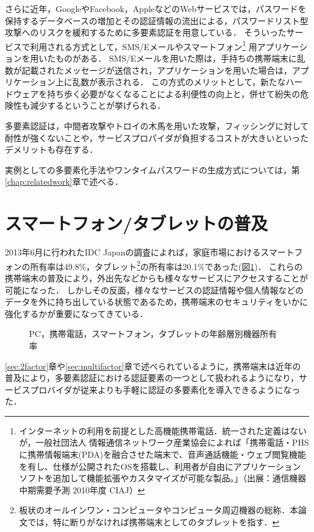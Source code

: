 さらに近年，GoogleやFacebook，AppleなどのWebサービスでは，パスワードを保持するデータベースの増加とその認証情報の流出による，パスワードリスト型攻撃へのリスク\cite{ipa07Outline}を緩和する\cite{lifehacker2F}ために多要素認証を用意している．
そういったサービスで利用される方式として，SMS/Eメールやスマートフォン\footnote{インターネットの利用を前提とした高機能携帯電話．統一された定義はないが，一般社団法人 情報通信ネットワーク産業協会によれば「携帯電話・PHSに携帯情報端末(PDA)を融合させた端末で、音声通話機能・ウェブ閲覧機能を有し、仕様が公開されたOSを搭載し、利用者が自由にアプリケーションソフトを追加して機能拡張やカスタマイズが可能な製品。」（出展：通信機器中期需要予測 2010年度 CIAJ）} 用アプリケーションを用いたものがある．
SMS/Eメールを用いた際は，手持ちの携帯端末に乱数が記載されたメッセージが送信され，アプリケーションを用いた場合は，アプリケーション上に乱数が表示される．
この方式のメリットとして，新たなハードウェアを持ち歩く必要がなくなることによる利便性の向上と，併せて紛失の危険性も減少するということが挙げられる．

多要素認証は，中間者攻撃やトロイの木馬を用いた攻撃，フィッシングに対して耐性が強くないことや，サービスプロパイダが負担するコストが大きいといったデメリットも存在する．

実例としての多要素化手法やワンタイムパスワードの生成方式については，第\ref{chap:relatedwork}章で述べる．


\section{スマートフォン/タブレットの普及}
2013年6月に行われたIDC Japanの調査\cite{idcsmartphone}によれば，家庭市場におけるスマートフォンの所有率は49.8\%，タブレット\footnote{板状のオールインワン・コンピュータやコンピュータ周辺機器の総称．本論文では，特に断りがなければ携帯端末としてのタブレットを指す．}の所有率は20.1\%であった(図\ref{fig:smartphoneUsage})．
これらの携帯端末の普及により，外出先などからも様々なサービスにアクセスすることが可能になった．
しかしその反面，様々なサービスの認証情報や個人情報などのデータを外に持ち出している状態であるため，携帯端末のセキュリティをいかに強化するかが重要になってきている．

\begin{figure}[th]
\begin{center}
\end{center}
\caption{PC，携帯電話，スマートフォン，タブレットの年齢層別機器所有率}
\label{fig:smartphoneUsage}
\end{figure}

\ref{sec:2factor}章や\ref{sec:multifactor}章で述べられているように，携帯端末は近年の普及により，多要素認証における認証要素の一つとして扱われるようになり，サービスプロバイダが従来よりも手軽に認証の多要素化を導入できるようになった．

\newpage
